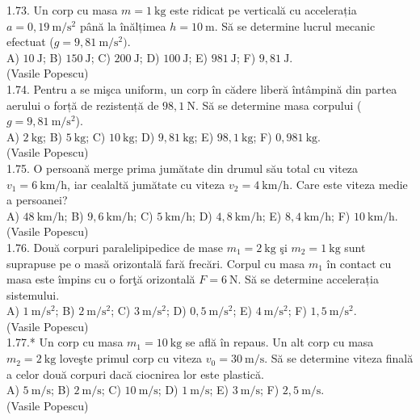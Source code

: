 1.73. Un corp cu masa $m=1 \mathrm{~kg}$ este ridicat pe verticală cu accelerația $a=0,19 \mathrm{~m} / \mathrm{s}^{2}$ până la înălțimea $h=10 \mathrm{~m}$. Să se determine lucrul mecanic efectuat ($g=9,81 \mathrm{~m} / \mathrm{s}^{2})$.\\ A) $10 \mathrm{~J}$; B) $150 \mathrm{~J}$; C) $200 \mathrm{~J}$; D) $100 \mathrm{~J}$; E) $981 \mathrm{~J}$; F) $9,81 \mathrm{~J}$.\\ (Vasile Popescu)\\

1.74. Pentru a se mişca uniform, un corp în cădere liberă întâmpină din partea aerului o forță de rezistență de $98,1 \mathrm{~N}$. Să se determine masa corpului ($g=9,81 \mathrm{~m} / \mathrm{s}^{2}$).\\ A) $2 \mathrm{~kg}$; B) $5 \mathrm{~kg}$; C) $10 \mathrm{~kg}$; D) $9,81 \mathrm{~kg}$; E) $98,1 \mathrm{~kg}$; F) $0,981 \mathrm{~kg}$.\\ (Vasile Popescu)\\

1.75. O persoană merge prima jumătate din drumul său total cu viteza $v_{1}=6 \mathrm{~km} / \mathrm{h}$, iar cealaltă jumătate cu viteza $v_{2}=4 \mathrm{~km} / \mathrm{h}$. Care este viteza medie a persoanei?\\ A) $48 \mathrm{~km} / \mathrm{h}$; B) $9,6 \mathrm{~km} / \mathrm{h}$; C) $5 \mathrm{~km} / \mathrm{h}$; D) $4,8 \mathrm{~km} / \mathrm{h}$; E) $8,4 \mathrm{~km} / \mathrm{h}$; F) $10 \mathrm{~km} / \mathrm{h}$.\\ (Vasile Popescu)\\

1.76. Două corpuri paralelipipedice de mase $m_{1}=2 \mathrm{~kg}$ şi $m_{2}=1 \mathrm{~kg}$ sunt suprapuse pe o masă orizontală fară frecări. Corpul cu masa $m_{1}$ în contact cu masa este împins cu o forţă orizontală $F=6 \mathrm{~N}$. Să se determine accelerația sistemului.\\ A) $1 \mathrm{~m} / \mathrm{s}^{2}$; B) $2 \mathrm{~m} / \mathrm{s}^{2}$; C) $3 \mathrm{~m} / \mathrm{s}^{2}$; D) $0,5 \mathrm{~m} / \mathrm{s}^{2}$; E) $4 \mathrm{~m} / \mathrm{s}^{2}$; F) $1,5 \mathrm{~m} / \mathrm{s}^{2}$.\\ (Vasile Popescu)\\

1.77.* Un corp cu masa $m_{1}=10 \mathrm{~kg}$ se află în repaus. Un alt corp cu masa $m_{2}=2 \mathrm{~kg}$ loveşte primul corp cu viteza $v_{0}=30 \mathrm{~m} / \mathrm{s}$. Să se determine viteza finală a celor două corpuri dacă ciocnirea lor este plastică.\\ A) $5 \mathrm{~m} / \mathrm{s}$; B) $2 \mathrm{~m} / \mathrm{s}$; C) $10 \mathrm{~m} / \mathrm{s}$; D) $1 \mathrm{~m} / \mathrm{s}$; E) $3 \mathrm{~m} / \mathrm{s}$; F) $2,5 \mathrm{~m} / \mathrm{s}$.\\ (Vasile Popescu)\\


